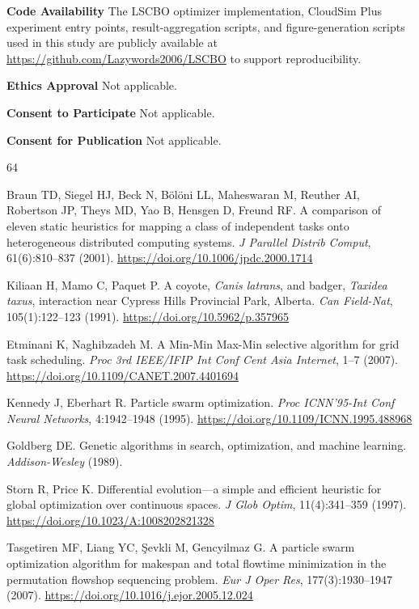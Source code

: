 \documentclass[pdflatex,onecolumn,sn-mathphys-num]{sn-jnl}
\begin{document}
\textbf{Code Availability} The LSCBO optimizer implementation, CloudSim Plus experiment entry points, result-aggregation scripts, and figure-generation scripts used in this study are publicly available at \url{https://github.com/Lazywords2006/LSCBO} to support reproducibility.

\textbf{Ethics Approval} Not applicable.

\textbf{Consent to Participate} Not applicable.

\textbf{Consent for Publication} Not applicable.

\begin{thebibliography}{64}

Braun TD, Siegel HJ, Beck N, B\"{o}l\"{o}ni LL, Maheswaran M, Reuther AI, Robertson JP, Theys MD, Yao B, Hensgen D, Freund RF. A comparison of eleven static heuristics for mapping a class of independent tasks onto heterogeneous distributed computing systems. \textit{J Parallel Distrib Comput}, 61(6):810--837 (2001). \url{https://doi.org/10.1006/jpdc.2000.1714}

Kiliaan H, Mamo C, Paquet P. A coyote, \textit{Canis latrans}, and badger, \textit{Taxidea taxus}, interaction near Cypress Hills Provincial Park, Alberta. \textit{Can Field-Nat}, 105(1):122--123 (1991). \url{https://doi.org/10.5962/p.357965}

Etminani K, Naghibzadeh M. A Min-Min Max-Min selective algorithm for grid task scheduling. \textit{Proc 3rd IEEE/IFIP Int Conf Cent Asia Internet}, 1--7 (2007). \url{https://doi.org/10.1109/CANET.2007.4401694}

Kennedy J, Eberhart R. Particle swarm optimization. \textit{Proc ICNN'95-Int Conf Neural Networks}, 4:1942--1948 (1995). \url{https://doi.org/10.1109/ICNN.1995.488968}

Goldberg DE. Genetic algorithms in search, optimization, and machine learning. \textit{Addison-Wesley} (1989).

Storn R, Price K. Differential evolution---a simple and efficient heuristic for global optimization over continuous spaces. \textit{J Glob Optim}, 11(4):341--359 (1997). \url{https://doi.org/10.1023/A:1008202821328}

Tasgetiren MF, Liang YC, \c{S}evkli M, Gencyilmaz G. A particle swarm optimization algorithm for makespan and total flowtime minimization in the permutation flowshop sequencing problem. \textit{Eur J Oper Res}, 177(3):1930--1947 (2007). \url{https://doi.org/10.1016/j.ejor.2005.12.024}


\end{thebibliography}
\end{document}
